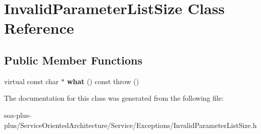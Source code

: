 \hypertarget{class_invalid_parameter_list_size}{
\section{InvalidParameterListSize Class Reference}
\label{class_invalid_parameter_list_size}
}
\subsection*{Public Member Functions}
\begin{DoxyCompactItemize}
\item 
\hypertarget{class_invalid_parameter_list_size_a222473502a02dec2fe9db0f9d60fd516}{
virtual const char $\ast$ {\bfseries what} () const   throw ()}
\label{class_invalid_parameter_list_size_a222473502a02dec2fe9db0f9d60fd516}

\end{DoxyCompactItemize}


The documentation for this class was generated from the following file:\begin{DoxyCompactItemize}
\item 
soa-\/plus-\/plus/ServiceOrientedArchitecture/Service/Exceptions/InvalidParameterListSize.h\end{DoxyCompactItemize}

